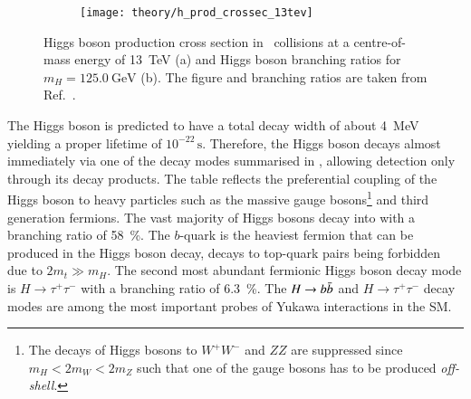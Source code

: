 \begin{figure}[htbp]
  \centering

  \begin{subfigure}[b]{0.47\textwidth}
    \centering

    \texttt{[image: theory/h\_prod\_crossec\_13tev]}

    \label{fig:higgs_prod_xsec}
  \end{subfigure}\hfill%
  \begin{subfigure}[b]{0.47\textwidth}
    \centering

    {
      \renewcommand{\arraystretch}{1.1}%
      
    }

    \vspace*{1.5em}

    \label{tab:higgs_branching_ratios}
  \end{subfigure}

  \caption[Higgs boson production cross section and branching ratios.]{Higgs
    boson production cross section in \pp~collisions at a centre-of-mass energy
    of \SI{13}{\TeV} (a) and Higgs boson branching ratios for
    $m_{H} = \SI{125.0}{\GeV}$ (b). The figure and branching ratios are taken
    from Ref.~\cite{deFlorian:2016spz_book}.}
\end{figure}

The Higgs boson is predicted to have a total decay width of about
\SI{4}{\MeV}~\cite{deFlorian:2016spz_book} yielding a proper lifetime of
$10^{-22}\,\si{\second}$. Therefore, the Higgs boson decays almost immediately
via one of the decay modes summarised in ,
allowing detection only through its decay products. The table reflects the
preferential coupling of the Higgs boson to heavy particles such as the massive
gauge bosons\footnote{The decays of Higgs bosons to $W^+W^-$ and $ZZ$ are
  suppressed since $m_{H} < 2 m_{W} < 2 m_{Z}$ such that one of the gauge bosons
  has to be produced \emph{off-shell}.} and third generation fermions. The vast
majority of Higgs bosons decay into \bbbar with a branching ratio of
\SI{58}{\percent}. The $b$-quark is the heaviest fermion that can be produced in
the Higgs boson decay, decays to top-quark pairs being forbidden due to
$2 m_t \gg m_H$. The second most abundant fermionic Higgs boson decay mode is
$H \to \tau^+ \tau^-$ with a branching ratio of \SI{6.3}{\percent}. The
$H \to b\bar{b}$ and $H \to \tau^+ \tau^-$ decay modes are among the most
important probes of Yukawa interactions in the SM.


